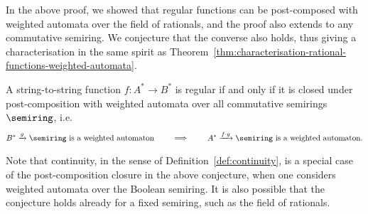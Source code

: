 In the above proof, we showed that regular functions can be post-composed with weighted automata over the field of rationals, and the proof also extends to any commutative semiring. We conjecture that the converse also holds, thus giving a characterisation in the same spirit as Theorem~\ref{thm:characterisation-rational-functions-weighted-automata}.
\begin{conjecture}\label{conj:regular-via-weighted-automata}
    A string-to-string function $f : A^* \to B^*$ is regular if and only if it is closed under post-composition with weighted automata over all commutative semirings $\semiring$, i.e.
    \begin{align*}
    B^* \xrightarrow g \semiring \text{ is a weighted automaton} \qquad \implies \qquad A^* \xrightarrow{f \cdot g} \semiring \text{ is a weighted automaton}.
    \end{align*}
\end{conjecture}
Note that continuity, in the sense of Definition~\ref{def:continuity}, is a special case of the post-composition closure in the above conjecture, when one considers weighted automata over the Boolean semiring. It is also possible that the conjecture holds already for a fixed semiring, such as the field of rationals.
\exerciseheader 

